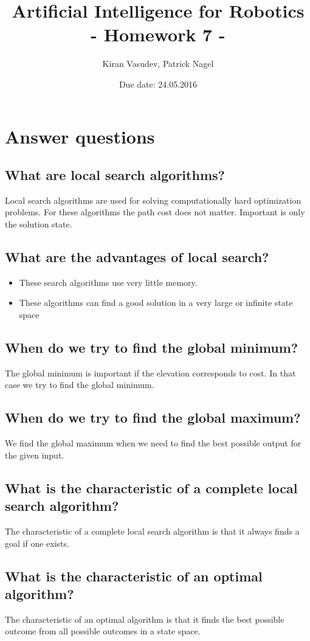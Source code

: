 \documentclass[11pt]{article}
\title{\textbf{Artificial Intelligence for Robotics\\ - Homework 7 -}}
\author{Kiran Vasudev, Patrick Nagel}
\date{Due date: 24.05.2016}
\begin{document}
\maketitle

\newpage
\tableofcontents

\newpage
\section{Answer questions}
\subsection{What are local search algorithms?}
Local search algorithms are used for solving computationally hard optimization problems. For these algorithms the path cost does not matter. Important is only the solution state.
\subsection{What are the advantages of local search?}
\begin{itemize}
\item {These search algorithms use very little memory.}
\item {These algorithms can find a good solution in a very large or infinite state space}
\end{itemize}

\subsection{When do we try to find the global minimum?}
The global minimum is important if the elevation corresponds to cost. In that case we try to find the global minimum. 

\subsection{When do we try to find the global maximum?}
We find the global maximum when we need to find the best possible output for the given input.

\subsection{What is the characteristic of a complete local search algorithm?}
The characteristic of a complete local search algorithm is that it always finds a goal if one exists.

\subsection{What is the characteristic of an optimal algorithm?}
The characteristic of an optimal algorithm is that it finds the best possible outcome from all possible outcomes in a state space.
\end{document}
